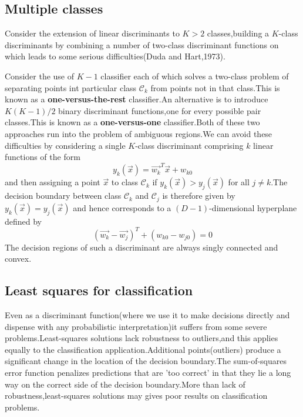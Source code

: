 \subsection{Multiple classes}
Consider the extension of linear discriminants to $ K >2$ classes,building a $K$-class discriminants by combining a number of two-class discriminant functions on which leads to some serious difficulties(Duda and Hart,1973).

Consider the use of $K-1$ classifier each of which solves a two-class problem of separating points int particular class $\mathcal{C}_k$ from points not in that class.This is known as a \textbf{one-versus-the-rest} classifier.An alternative is to introduce $K(K-1)/2$ binary discriminant functions,one for every possible pair classes.This is known as a \textbf{one-versus-one} classifier.Both of these two approaches run into the problem of ambiguous regions.We can avoid these difficulties by considering a single $K$-class discriminant comprising $k$ linear functions of the form
\begin{equation}
y_k(\vec{x}) = \vec{w_k}^T\vec{x}+w_{k0}
\end{equation}
and then assigning a point $\vec{x}$ to class $\mathcal{C}_k$ if $y_k(\vec{x}) > y_j(\vec{x})$ for all $j \neq k$.The decision boundary between class $\mathcal{C}_k$ and $\mathcal{C}_j$ is therefore given by $y_k(\vec{x}) = y_j(\vec{x})$ and hence corresponds to a $(D-1)$-dimensional hyperplane defined by
\begin{equation}
(\vec{w_k}-\vec{w_j})^T + (w_{k0}-w_{j0}) = 0
\end{equation}
The decision regions of such a discriminant are always singly connected and convex.

\subsection{Least squares for classification}
Even as a discriminant function(where we use it to make decisions directly and dispense with any probabilistic interpretation)it suffers from some severe problems.Least-squares solutions lack robustness to outliers,and this applies equally to the classification application.Additional points(outliers) produce a significant change in the location of the decision boundary.The sum-of-squares error function penalizes predictions that are 'too correct' in that they lie a long way on the correct side of the decision boundary.More than lack of robustness,least-squares solutions may gives poor results on classification problems.

